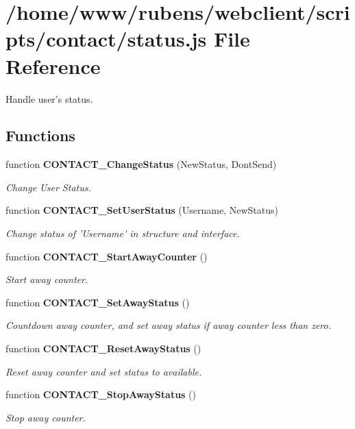 \section{/home/www/rubens/webclient/scripts/contact/status.js File Reference}
\label{status_8js}
Handle user's status. 

\subsection*{Functions}
\begin{CompactItemize}
\item 
function {\bf CONTACT\_\-ChangeStatus} (NewStatus, DontSend)
\begin{CompactList}\small\item\em Change User Status. \item\end{CompactList}\item 
function {\bf CONTACT\_\-SetUserStatus} (Username, NewStatus)
\begin{CompactList}\small\item\em Change status of 'Username' in structure and interface. \item\end{CompactList}\item 
function {\bf CONTACT\_\-StartAwayCounter} ()
\begin{CompactList}\small\item\em Start away counter. \item\end{CompactList}\item 
function {\bf CONTACT\_\-SetAwayStatus} ()
\begin{CompactList}\small\item\em Countdown away counter, and set away status if away counter less than zero. \item\end{CompactList}\item 
function {\bf CONTACT\_\-ResetAwayStatus} ()
\begin{CompactList}\small\item\em Reset away counter and set status to available. \item\end{CompactList}\item 
function {\bf CONTACT\_\-StopAwayStatus} ()
\begin{CompactList}\small\item\em Stop away counter. \item\end{CompactList}\end{CompactItemize}


